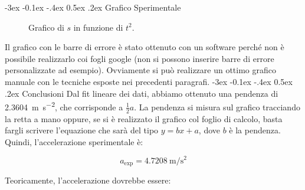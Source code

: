 \documentclass[12pt,a4paper,oneside]{book}
\makeatletter
\renewcommand{\subsection}{\@startsection {subsection}{2}{\z@}
{-3ex \@plus -0.1ex \@minus -.4ex}
{0.5ex \@plus.2ex }
{\color[rgb]{0.141,0.596,0.749}\normalfont\sffamily\bfseries}}
\theoremstyle{esercizio}
\makeatother
\begin{document}
\subsection{Grafico Sperimentale}

\begin{figure}[!htbp] 
    \centering
    \caption{Grafico di $s$ in funzione di $t^2$.}
    \label{fig:grafico}
\end{figure}
Il grafico con le barre di errore è stato ottenuto con un software perché non è possibile realizzarlo coi fogli google (non si possono inserire barre di errore personalizzate ad esempio). Ovviamente si può realizzare un ottimo grafico manuale con le tecniche esposte nei precedenti paragrafi.
\subsection{Conclusioni}
Dal fit lineare dei dati, abbiamo ottenuto una pendenza di \SI{2.3604}{\metre\per\second\squared}, che corrisponde a $\frac{1}{2}a$. La pendenza si misura sul grafico tracciando la retta a mano  oppure, se si è realizzato il grafico col foglio di calcolo, basta fargli scrivere l'equazione che sarà del tipo $y= bx +a$, dove $b$ è la pendenza. Quindi, l'accelerazione sperimentale è:

\begin{equation}
    a_{\text{exp}} = \SI{4.7208}{\metre\per\second\squared}
\end{equation}

Teoricamente, l'accelerazione dovrebbe essere:
\end{document}
